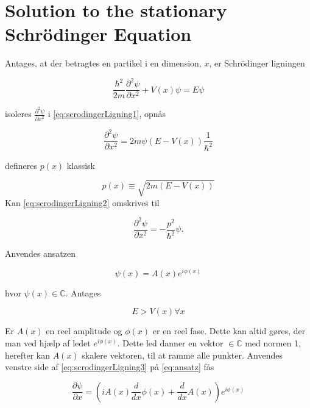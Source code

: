 \section{Solution to the stationary Schrödinger Equation}

Antages, at der betragtes en partikel i en dimension, $x$,  er Schrödinger ligningen

\begin{equation}
    \frac{\hbar^2}{2m}\frac{\partial^2 \psi}{\partial x^2} + V(x) \psi = E \psi
    \label{eq:scrodingerLigning1}
\end{equation}

isoleres $\frac{\partial^2 \psi}{\partial x^2}$ i \cref{eq:scrodingerLigning1}, opnås

\begin{equation}
    \frac{\partial^2 \psi}{\partial x^2} = 2m\psi (E  - V(x)) \frac{1}{\hbar^2}
    \label{eq:scrodingerLigning2}
\end{equation}

defineres $p(x)$ klassisk

\begin{equation}
p(x) \equiv \sqrt{2m(E-V(x))}
\end{equation}
Kan \cref{eq:scrodingerLigning2} omskrives til

\begin{equation}
    \frac{\partial^2 \psi}{\partial x^2} = - \frac{p^2}{\hbar^2} \psi.
    \label{eq:scrodingerLigning3}
\end{equation}

Anvendes ansatzen

\begin{equation}
    \psi(x) = A(x) e^{i \phi(x)}
    \label{eq:ansatz}
\end{equation}

hvor $\psi (x) \in \mathbb{C}$. Antages

\begin{equation}
 E > V(x) \forall x
\end{equation}

Er $A(x)$ en reel amplitude og $\phi(x)$ er en reel fase. Dette kan altid gøres, der man ved hjælp af ledet  $e^{i \phi(x)} $. Dette led danner en vektor $ \in \mathbb{C}$ med normen 1, herefter kan $A(x)$  skalere vektoren, til at ramme alle punkter. Anvendes venstre side af \cref{eq:scrodingerLigning3} på \cref{eq:ansatz} fås

\begin{equation}
    \frac{\partial \psi}{\partial x} = \left(i A{\left (x \right )} \frac{d}{d x} \phi{\left (x \right )} + \frac{d}{d x} A{\left (x \right )}\right) e^{i \phi{\left (x \right )}}
    \label{eq:diff1gange}
\end{equation}

